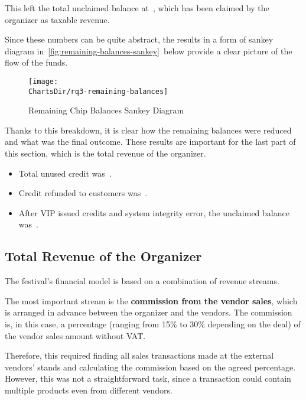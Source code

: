 This left the total unclaimed balance at~, which has been claimed by the organizer as taxable revenue.

Since these numbers can be quite abstract, the results in a form of sankey diagram in~\autoref{fig:remaining-balances-sankey}~below provide a clear picture of the flow of the funds.

\begin{figure}[H]
	\centering
	\texttt{[image: \\ChartsDir/rq3-remaining-balances]}
	\caption{ Remaining Chip Balances Sankey Diagram}
	\label{fig:remaining-balances-sankey}
	\source
\end{figure}

Thanks to this breakdown, it is clear how the remaining balances were reduced and what was the final outcome.
These results are important for the last part of this section, which is the total revenue of the organizer.

\begin{keytakeaways}
	\begin{itemize}
		\item Total unused credit was~.
		\item Credit refunded to customers was~.
		\item After VIP issued credits and system integrity error, the unclaimed balance was~.
	\end{itemize}
\end{keytakeaways}


\subsection{Total Revenue of the Organizer}
\label{subsec:analysis-total-revenue}

The festival's financial model is based on a combination of revenue streams.

The most important stream is the \textbf{commission from the vendor sales}, which is arranged in advance between the organizer and the vendors.
The commission is, in this case, a percentage (ranging from 15\% to 30\% depending on the deal) of the vendor sales amount without VAT\@.

Therefore, this required finding all sales transactions made at the external vendors' stands and calculating the commission based on the agreed percentage.
However, this was not a straightforward task, since a transaction could contain multiple products even from different vendors.

